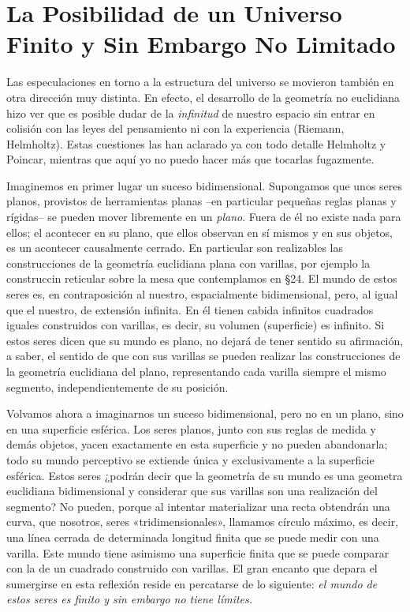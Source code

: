 \documentclass[spanish]{book}
\begin{document}
\chapter{La Posibilidad de un Universo Finito y Sin Embargo No Limitado}

Las especulaciones en torno a la estructura del universo se movieron también en otra
dirección muy distinta. En efecto, el desarrollo de la geometría no euclidiana hizo ver
que es posible dudar de la \textit{infinitud} de nuestro espacio sin entrar en colisión con las
leyes del pensamiento ni con la experiencia (Riemann, Helmholtz). Estas cuestiones
las han aclarado ya con todo detalle Helmholtz y Poincar, mientras que aquí yo no
puedo hacer más que tocarlas fugazmente.

Imaginemos en primer lugar un suceso bidimensional. Supongamos que unos seres
planos, provistos de herramientas planas --en particular pequeñas reglas planas y
rígidas-- se pueden mover libremente en un \textit{plano}. Fuera de él no existe nada para
ellos; el acontecer en su plano, que ellos observan en sí mismos y en sus objetos, es un
acontecer causalmente cerrado. En particular son realizables las construcciones de la
geometría euclidiana plana con varillas, por ejemplo la construccin reticular sobre la
mesa que contemplamos en \S 24. El mundo de estos seres es, en contraposición al
nuestro, espacialmente bidimensional, pero, al igual que el nuestro, de extensión
infinita. En él tienen cabida infinitos cuadrados iguales construidos con varillas, es
decir, su volumen (superficie) es infinito. Si estos seres dicen que su mundo es
plano, no dejará de tener sentido su afirmación, a saber, el sentido de que con sus
varillas se pueden realizar las construcciones de la geometría euclidiana del plano,
representando cada varilla siempre el mismo segmento, independientemente de su
posición.

Volvamos ahora a imaginarnos un suceso bidimensional, pero no en un plano, sino en
una superficie esférica. Los seres planos, junto con sus reglas de medida y demás
objetos, yacen exactamente en esta superficie y no pueden abandonarla; todo su mundo
perceptivo se extiende única y exclusivamente a la superficie esférica. Estos seres
¿podrán decir que la geometría de su mundo es una geometra euclidiana bidimensional
y considerar que sus varillas son una realización del segmento? No pueden, porque al
intentar materializar una recta obtendrán una curva, que nosotros, seres
«tridimensionales», llamamos círculo máximo, es decir, una línea cerrada de
determinada longitud finita que se puede medir con una varilla. Este mundo tiene asimismo
una superficie finita que se puede comparar con la de un cuadrado construido
con varillas. El gran encanto que depara el sumergirse en esta reflexión reside en
percatarse de lo siguiente: \textit{el mundo de estos seres es finito y sin embargo no tiene límites.}
\end{document}
